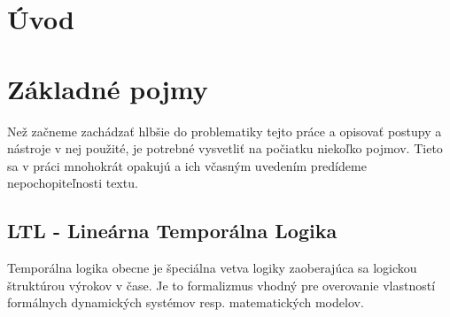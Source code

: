 \documentclass[11pt,final,oneside]{fithesis}
\begin{document}
\FrontMatter
\ThesisTitlePage


\begin{ThesisDeclaration}
\DeclarationText
\AdvisorName
\end{ThesisDeclaration}

\begin{ThesisThanks}
\end{ThesisThanks}

\begin{ThesisAbstract}
\end{ThesisAbstract}

\begin{ThesisKeyWords}
\end{ThesisKeyWords}

\MainMatter
\tableofcontents
\chapter*{\' Uvod}

\chapter{Z\' akladn\' e pojmy}
Ne\v z za\v cneme zach\' adza\v t hlb\v sie do problematiky tejto pr\' ace a opisova\v t postupy a n\' astroje v nej pou\v zit\' e, 
je potrebn\' e vysvetli\v t na po\v ciatku nieko\v lko pojmov. Tieto sa v pr\' aci mnohokr\' at opakuj\' u a ich v\v casn\' ym uveden\' im
pred\' ideme nepochopite\v lnosti textu.

\section{LTL - Line\' arna Tempor\' alna Logika}
\label{sec:logika}
Tempor\' alna logika obecne je \v speci\' alna vetva logiky zaoberaj\' uca sa logickou \v strukt\' urou v\' yrokov v \v case. 
Je to formalizmus vhodn\' y pre overovanie vlastnost\' i form\' alnych dynamick\' ych syst\' emov resp. matematick\' ych modelov.
\end{document}
